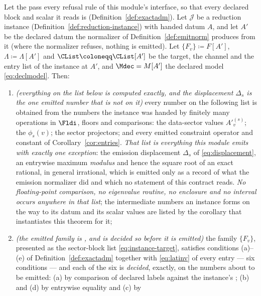 \begin{theorem}\label{thm:emit}
Let the  pass every refusal rule of this module's
interface, so that every declared block and scalar it reads is
(Definition~\ref{def:exactadm}). Let $\mathcal{J}$ be a reduction instance
(Definition~\ref{def:reduction-instance}) with handed datum $A$, and let $A'$
be the declared datum the normalizer of Definition~\ref{def:emitnorm}
produces from it (where the normalizer refuses, nothing is emitted). Let
$\{F_v\}\coloneqq F[A']$, $\Lambda\coloneqq\Lambda[A']$ and
$\CList\coloneqq\CList[A']$ be the target, the channel and the entry list of
the instance at $A'$, and $\Mdec=M[A']$ the declared model
\eqref{eq:declmodel}. Then:
\begin{enumerate}[label=(\roman*),leftmargin=3.0em]
\item \emph{(everything on the list below is computed exactly, and the
  displacement $\Delta_s$ is the one emitted number that is not on it)} every
  number on the following list is obtained from the numbers the instance was
  handed by finitely many operations in $\Fldi$, floors and comparisons: the
  data-sector values $A'^{(s)}_v$; the 
  $\phi_s(v)$; the sector projectors; and every emitted constraint operator
  and constant of Corollary~\ref{cor:entries}. \emph{That list is everything
  this module emits with exactly one exception}: the emission displacement
  $\Delta_s$ of \eqref{eq:displacement}, an entrywise maximum \emph{modulus}
  and hence the square root of an exact rational, in general irrational, which
  is emitted only as a record of what the emission normalizer did and which
  no statement of this contract reads. \emph{No floating-point
  comparison, no eigenvalue routine, no enclosure and no interval occurs
  anywhere in that list}; the intermediate numbers an instance forms on the
  way to its datum and its scalar values are listed by the corollary that
  instantiates this theorem for it;
\item \emph{(the emitted family is , and is decided so
  before it is emitted)} the family $\{F_v\}$, presented as the sector-block list
  \eqref{eq:instance-target}, satisfies conditions (a)--(e) of
  Definition~\ref{def:exactadm} together with \eqref{eq:latinv} of every
  entry --- six conditions --- and each of the six is \emph{decided}, exactly, on the numbers
  about to be emitted: (a) by comparison of declared labels against the
  instance's ; (b) and (d) by entrywise equality and (c) by

\end{enumerate}
\end{theorem}

